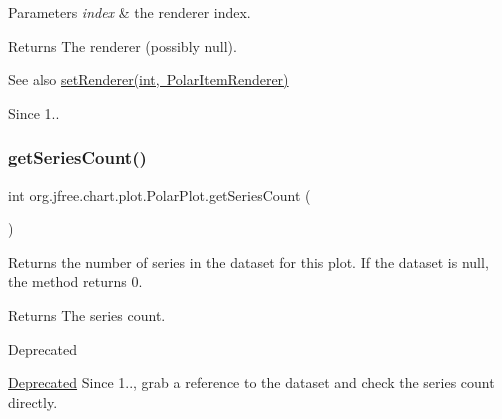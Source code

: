 \begin{DoxyParams}{Parameters}
{\em index} & the renderer index.\\
\hline
\end{DoxyParams}
\begin{DoxyReturn}{Returns}
The renderer (possibly {\ttfamily null}).
\end{DoxyReturn}
\begin{DoxySeeAlso}{See also}
\mbox{\hyperlink{classorg_1_1jfree_1_1chart_1_1plot_1_1_polar_plot_a3385d278068d3cf8773bda485a7ddb68}{set\+Renderer(int, Polar\+Item\+Renderer)}}
\end{DoxySeeAlso}
\begin{DoxySince}{Since}
1.. 
\end{DoxySince}
\mbox{\label{classorg_1_1jfree_1_1chart_1_1plot_1_1_polar_plot_af848837587b2dce24308e33bbaaffa1a}} 
\subsubsection{\texorpdfstring{get\+Series\+Count()}{getSeriesCount()}}
{\footnotesize\ttfamily int org.\+jfree.\+chart.\+plot.\+Polar\+Plot.\+get\+Series\+Count (\begin{DoxyParamCaption}{ }\end{DoxyParamCaption})}

Returns the number of series in the dataset for this plot. If the dataset is {\ttfamily null}, the method returns 0.

\begin{DoxyReturn}{Returns}
The series count.
\end{DoxyReturn}
\begin{DoxyRefDesc}{Deprecated}
\item[\mbox{\hyperlink{deprecated__deprecated000082}{Deprecated}}]Since 1.., grab a reference to the dataset and check the series count directly. \end{DoxyRefDesc}
\mbox{\label{classorg_1_1jfree_1_1chart_1_1plot_1_1_polar_plot_ad76d83b6179eed10de0c216bbbd6437e}} 
